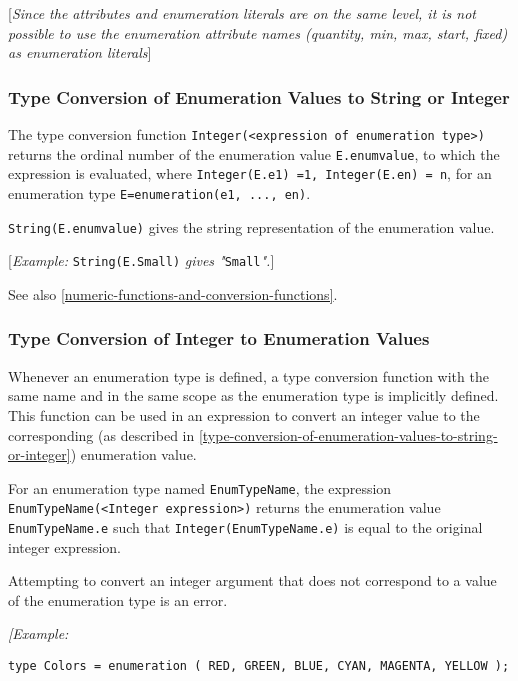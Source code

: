 {[}\emph{Since the attributes and enumeration literals are on the same
level, it is not possible to use the enumeration attribute names
(quantity, min, max, start, fixed) as enumeration literals}{]}

\subsubsection{Type Conversion of Enumeration Values to String or Integer}

The type conversion function \lstinline!Integer(<expression of enumeration type>)! returns the ordinal number of the
enumeration value \lstinline!E.enumvalue!, to which the expression is evaluated,
where \lstinline!Integer(E.e1) =1, Integer(E.en) = n!, for an enumeration type
\lstinline!E=enumeration(e1, ..., en)!.

\lstinline!String(E.enumvalue)! gives the string representation of the enumeration
value. 

{[}\emph{Example:} \lstinline!String(E.Small)! \emph{gives
"}\lstinline!Small!\emph{".}{]}

See also \autoref{numeric-functions-and-conversion-functions}.

\subsubsection{Type Conversion of Integer to Enumeration Values}

Whenever an enumeration type is defined, a type conversion function with
the same name and in the same scope as the enumeration type is
implicitly defined. This function can be used in an expression to
convert an integer value to the corresponding (as described in \autoref{type-conversion-of-enumeration-values-to-string-or-integer}) enumeration value.

For an enumeration type named \lstinline!EnumTypeName!, the expression
\lstinline!EnumTypeName(<Integer expression>)! returns the
enumeration value \lstinline!EnumTypeName.e! such that \lstinline!Integer(EnumTypeName.e)! is
equal to the original integer expression.

Attempting to convert an integer argument that does not correspond to a
value of the enumeration type is an error.

\emph{{[}Example: }
\begin{lstlisting}[language=modelica]
type Colors = enumeration ( RED, GREEN, BLUE, CYAN, MAGENTA, YELLOW );
\end{lstlisting}

